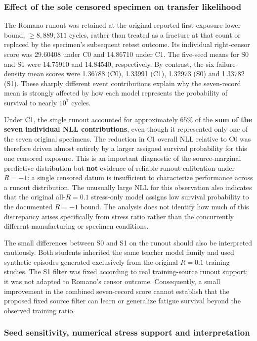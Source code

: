 \documentclass[12pt,a4paper]{article}
\begin{document}
\subsubsection{Effect of the sole censored specimen on transfer likelihood}

The Romano runout was retained at the original reported first-exposure lower bound, \(\geq 8{,}889{,}311\) cycles, rather than treated as a fracture at that count or replaced by the specimen's subsequent retest outcome. Its individual right-censor score was 29.60408 under C0 and 14.86710 under C1. The five-seed means for S0 and S1 were 14.75910 and 14.84540, respectively. By contrast, the six failure-density mean scores were 1.36788 (C0), 1.33991 (C1), 1.32973 (S0) and 1.33782 (S1). These sharply different event contributions explain why the seven-record mean is strongly affected by how each model represents the probability of survival to nearly \(10^7\) cycles.

Under C1, the single runout accounted for approximately 65\% of the \textbf{sum of the seven individual NLL contributions}, even though it represented only one of the seven original specimens. The reduction in C1 overall NLL relative to C0 was therefore driven almost entirely by a larger assigned survival probability for this one censored exposure. This is an important diagnostic of the source-marginal predictive distribution but \textbf{not} evidence of reliable runout calibration under \(R=-1\): a single censored datum is insufficient to characterize performance across a runout distribution. The unusually large NLL for this observation also indicates that the original all-\(R=0.1\) stress-only model assigns low survival probability to the documented \(R=-1\) bound. The analysis does not identify how much of this discrepancy arises specifically from stress ratio rather than the concurrently different manufacturing or specimen conditions.

The small differences between S0 and S1 on the runout should also be interpreted cautiously. Both students inherited the same teacher model family and used synthetic episodes generated exclusively from the original \(R=0.1\) training studies. The S1 filter was fixed according to real training-source runout support; it was not adapted to Romano's censor outcome. Consequently, a small improvement in the combined seven-record score cannot establish that the proposed fixed source filter can learn or generalize fatigue survival beyond the observed training ratio.

\subsubsection{Seed sensitivity, numerical stress support and interpretation}
\end{document}
